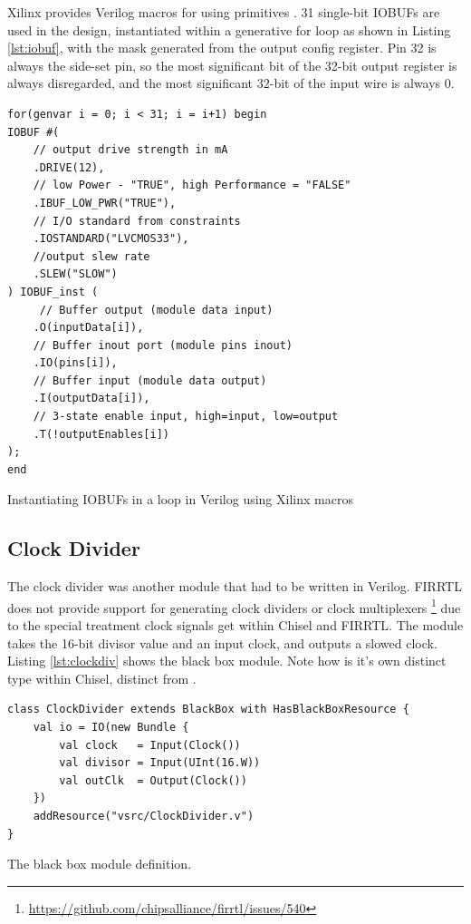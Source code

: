 Xilinx provides Verilog macros for using primitives \cite{vivado_libs}. 31 single-bit IOBUFs are used in the design, instantiated within a generative for loop as shown in Listing \ref{lst:iobuf}, with the  mask generated from the output config register. Pin 32 is always the side-set pin, so the most significant bit of the 32-bit output register is always disregarded, and the most significant 32-bit of the input wire is always 0.

\begin{listing}[h!]
    \vspace{0.5cm}
    \begin{verbatim}
for(genvar i = 0; i < 31; i = i+1) begin
IOBUF #( 
    // output drive strength in mA
    .DRIVE(12), 
    // low Power - "TRUE", high Performance = "FALSE"
    .IBUF_LOW_PWR("TRUE"),  
    // I/O standard from constraints
    .IOSTANDARD("LVCMOS33"),
    //output slew rate 
    .SLEW("SLOW") 
) IOBUF_inst (
     // Buffer output (module data input)
    .O(inputData[i]),
    // Buffer inout port (module pins inout)     
    .IO(pins[i]),   
    // Buffer input (module data output)
    .I(outputData[i]),     
    // 3-state enable input, high=input, low=output
    .T(!outputEnables[i])     
);
end
    \end{verbatim}
    \caption{Instantiating IOBUFs in a loop in Verilog using Xilinx macros \cite{vivado_libs}}
    \label{lst:iobuf}
\end{listing}

\subsection{Clock Divider}

The clock divider was another module that had to be written in Verilog. FIRRTL does not provide support for generating clock dividers or clock multiplexers \footnote{\url{https://github.com/chipsalliance/firrtl/issues/540}} due to the special treatment clock signals get within Chisel and FIRRTL. The module takes the 16-bit divisor value and an input clock, and outputs a slowed clock. Listing \ref{lst:clockdiv} shows the black box module. Note how  is it's own distinct type within Chisel, distinct from .

\begin{listing}[h!]
    \centering
    \vspace{0.5cm}
    \begin{verbatim}
class ClockDivider extends BlackBox with HasBlackBoxResource {
    val io = IO(new Bundle {
        val clock   = Input(Clock())
        val divisor = Input(UInt(16.W))
        val outClk  = Output(Clock())
    })
    addResource("vsrc/ClockDivider.v")
}
    \end{verbatim}
    \caption{The  black box module definition.}
    \label{lst:clockdiv}
\end{listing}

